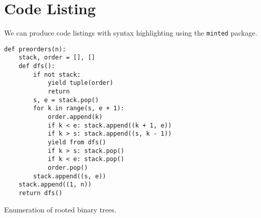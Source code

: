 \documentclass[11pt]{article}
\begin{document}
\pagebreak
\section{Code Listing}
We can produce code listings with syntax highlighting using the \verb|minted| package.

\begin{listing}[h]
\begin{verbatim}
def preorders(n):
    stack, order = [], []
    def dfs():
        if not stack:
            yield tuple(order)
            return
        s, e = stack.pop()
        for k in range(s, e + 1):
            order.append(k)
            if k < e: stack.append((k + 1, e))
            if k > s: stack.append((s, k - 1))
            yield from dfs()
            if k > s: stack.pop()
            if k < e: stack.pop()
            order.pop()
        stack.append((s, e))
    stack.append((1, n))
    return dfs()
\end{verbatim}
\caption{Enumeration of rooted binary trees.}
\end{listing}
\end{document}

